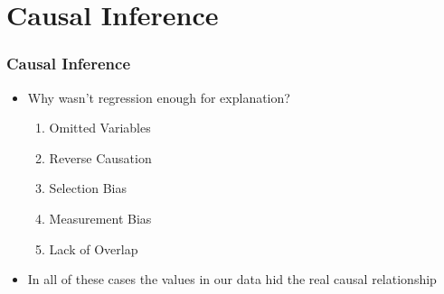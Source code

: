 \documentclass[xcolor=x11names,compress]{beamer}\usepackage[]{graphicx}\usepackage[]{color}
\renewcommand{\(}{\begin{columns}}
\renewcommand{\)}{\end{columns}}
\newcommand{\<}[1]{\begin{column}{#1}}
\renewcommand{\>}{\end{column}}
\begin{document}
\section{Causal Inference}

\begin{frame}
\frametitle{Causal Inference}
\begin{itemize}
\item Why wasn't regression enough for explanation?
\begin{enumerate}
\item Omitted Variables
\item Reverse Causation
\item Selection Bias
\item Measurement Bias
\item Lack of Overlap
\end{enumerate}
\item In all of these cases the values in our data hid the real causal relationship
\end{itemize}
\end{frame}
\end{document}
